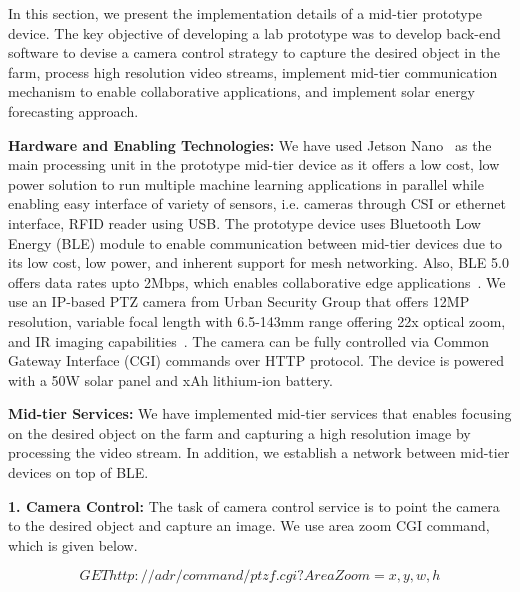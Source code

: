 In this section, we present the implementation details of a mid-tier prototype device. The key objective of developing a lab prototype was to develop back-end software to devise a camera control strategy to capture the desired object in the farm, process high resolution video streams, implement mid-tier communication mechanism to enable collaborative applications, and implement solar energy forecasting approach. 

\noindent
\textbf{Hardware and Enabling Technologies:} We have used Jetson Nano~\cite{jetson-nano} as the main processing unit in the prototype mid-tier device as it offers a low cost, low power solution to run multiple machine learning applications in parallel while enabling easy interface of variety of sensors, i.e. cameras through CSI or ethernet interface, RFID reader using USB. The prototype device uses Bluetooth Low Energy (BLE) module to enable communication between mid-tier devices due to its low cost, low power, and inherent support for mesh networking. Also, BLE 5.0 offers data rates upto 2Mbps, which enables collaborative edge applications~\cite{ble5}. 
We use an IP-based PTZ camera from Urban Security Group that offers 12MP resolution, variable focal length with 6.5-143mm range offering 22x optical zoom, and IR imaging capabilities~\cite{camera-link}. The camera can be fully controlled via Common Gateway Interface (CGI) commands over HTTP protocol. 
The device is powered with a 50W solar panel and xAh lithium-ion battery. 

\noindent
\textbf{Mid-tier Services:} We have implemented mid-tier services that enables focusing on the desired object on the farm and capturing a high resolution image by processing the video stream. In addition, we establish a network between mid-tier devices on top of BLE. 

\noindent
\textbf{1. Camera Control:} The task of camera control service is to point the camera to the desired object and capture an image. We use area zoom CGI command, which is given below. 

\vspace{-1em}
\begin{equation*}
    GET http://adr/command/ptzf.cgi?AreaZoom=x,y,w,h 
\end{equation*}

